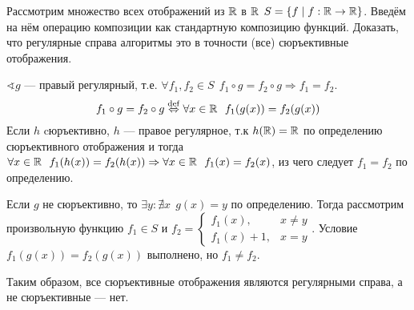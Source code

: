 

\cfoot{}



\begin{exercise}
    Рассмотрим множество всех отображений из \(\mathbb{R}\) в \(\mathbb{R}\) \(S = \{f \mid f : \mathbb{R} \to \mathbb{R}\}\). Введём на нём операцию композиции как стандартную композицию функций. Доказать, что регулярные справа алгоритмы это в точности (все) сюръективные отображения.
\end{exercise}
\begin{solution}
    \(\sphericalangle g\) --- правый регулярный, т.е. \(\forall f_1, f_2 \in S \ \ f_1 \circ g = f_2 \circ g \Rightarrow f_1 = f_2\).
    \[f_1 \circ g = f_2 \circ g \stackrel{\mathrm{def}}{\Leftrightarrow} \forall x \in \mathbb{R} \ \ f_1(g(x)) = f_2(g(x))\]
    Если \(h\) cюръективно, \(h\) --- правое регулярное, т.к \(h(\mathbb{R}) = \mathbb{R}\) по определению сюръективного отображения и тогда \(\forall x \in \mathbb{R} \ \ f_1(h(x)) = f_2(h(x)) \Rightarrow \forall x \in \mathbb{R} \ \ f_1(x) = f_2(x)\), из чего следует \(f_1 = f_2\) по определению.

    Если \(g\) не сюръективно, то \(\exists y : \nexists x \ \ g(x) = y\) по определению. Тогда рассмотрим произвольную функцию \(f_1 \in S\) и \(f_2 = \begin{cases}
        f_1(x),     & x \neq y \\
        f_1(x) + 1, & x = y
    \end{cases}\). Условие \(f_1(g(x)) = f_2(g(x))\) выполнено, но \(f_1 \neq f_2\).

    Таким образом, все сюръективные отображения являются регулярными справа, а не сюръективные --- нет.
\end{solution}

